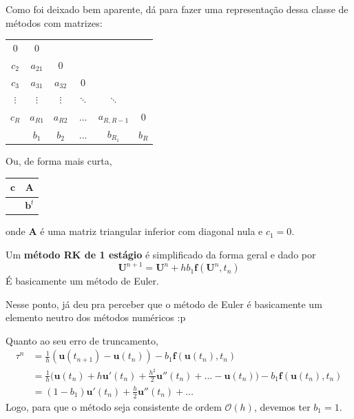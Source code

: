 \documentclass[../differential_methods.tex]{subfiles}
\begin{document}
Como foi deixado bem aparente, dá para fazer uma representação dessa classe de métodos com matrizes:
\begin{table}[H]
	\centering
	\begin{tabular}{c | c c c c c}
		0          & 0          &            &             &                &           \\
		\(c_2\)    & \(a_{21}\) & 0          &             &                &           \\
		\(c_3\)    & \(a_{31}\) & \(a_{32}\) & 0           &                &           \\
		\(\vdots\) & \(\vdots\) & \(\vdots\) & \(\ddots\)  & \(\ddots\)     &           \\
		\(c_{R}\)  & \(a_{R1}\) & \(a_{R2}\) & \(\dotsc\)  & \(a_{R, R-1}\) & 0         \\
		\hline
		           & \(b_1\)    & \(b_2\)    & \(\dotsc \) & \(b_{R_1}\)    & \(b_{R}\)
	\end{tabular}
\end{table}

Ou, de forma mais curta,
\begin{table}[H]
	\centering
	\begin{tabular}{c | c}
		\(\mathbf{c}\) & \(\mathbf{A}\)     \\
		\hline
		               & \(\mathbf{b}^{t}\)
	\end{tabular}
\end{table}
onde \(\mathbf{A}\) é uma matriz triangular inferior com diagonal nula e \(c_{1} = 0\).

Um \textbf{método RK de 1 estágio} é simplificado da forma geral e dado por
\[
	\boxed{\mathbf{U}^{n+1} = \mathbf{U}^{n} + h b_{1}\mathbf{f}(\mathbf{U}^{n}, t_{n})}
\]
É basicamente um método de Euler.
\begin{tcolorbox}[
		skin=enhanced,
		title=Observação,
		fonttitle=\bfseries,
		colframe=black,
		colbacktitle=cyan!75!white,
		colback=cyan!15,
		colbacklower=black,
		coltitle=black,
		drop fuzzy shadow,
	]
	Nesse ponto, já deu pra perceber que o método de Euler é basicamente um elemento neutro dos métodos numéricos :p
\end{tcolorbox}

Quanto ao seu erro de truncamento,
\begin{align*}
	\tau^{n} & = \frac{1}{h}(\mathbf{u}(t_{n+1}) - \mathbf{u}(t_{n})) - b_1 \mathbf{f}(\mathbf{u}(t_{n}), t_{n})                                                                                 \\
	         & = \frac{1}{h}\biggl(\mathbf{u}(t_{n}) + h \mathbf{u}'(t_{n}) + \frac{h^{2}}{2} \mathbf{u}''(t_{n}) + \dotsc - \mathbf{u}(t_{n})\biggr) - b_1 \mathbf{f}(\mathbf{u}(t_{n}), t_{n}) \\
	         & = (1-b_1)\mathbf{u}'(t_{n}) + \frac{h}{2}\mathbf{u}''(t_{n}) + \dotsc
\end{align*}
Logo, para que o método seja consistente de ordem \(\mathcal{O}(h)\), devemos ter \(b_1 = 1.\)
\end{document}

